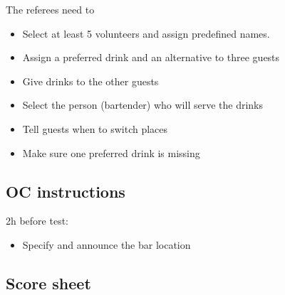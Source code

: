 The referees need to
\begin{itemize}
	\item Select at least 5 volunteers and assign predefined names.
	\item Assign a preferred drink and an alternative to three guests
	\item Give drinks to the other guests
	\item Select the person (bartender) who will serve the drinks
	\item Tell guests when to switch places
	\item Make sure one preferred drink is missing
\end{itemize}

\subsection*{OC instructions}

2h before test:
\begin{itemize}
	\item Specify and announce the bar location
\end{itemize}

\subsection*{Score sheet}


